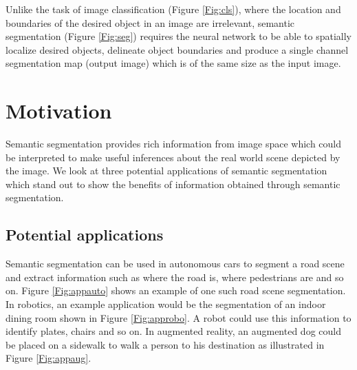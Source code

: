 Unlike the task of image classification (Figure \ref{Fig:cls}), where the location and boundaries of the desired object in an image are irrelevant, semantic segmentation (Figure \ref{Fig:seg}) requires the neural network to be able to spatially localize desired objects, delineate object boundaries and produce a single channel segmentation map (output image) which is of the same size as the input image.

\section{Motivation}

Semantic segmentation provides rich information from image space which could be interpreted to make useful inferences about the real world scene depicted by the image. We look at three potential applications of semantic segmentation which stand out to show the benefits of information obtained through semantic segmentation. 

\subsection{Potential applications}

Semantic segmentation can be used in autonomous cars to segment a road scene and extract information such as where the road is, where pedestrians are and so on. Figure \ref{Fig:appauto} shows an example of one such road scene segmentation. In robotics, an example application would be the segmentation of an indoor dining room shown in Figure \ref{Fig:approbo}. A robot could use this information to identify plates, chairs and so on. In augmented reality, an augmented dog could be placed on a sidewalk to walk a person to his destination as illustrated in Figure \ref{Fig:appaug}. 

